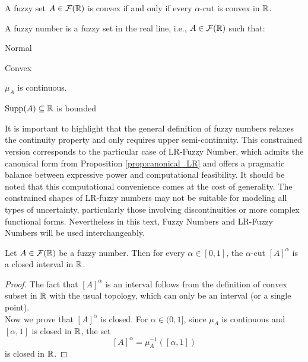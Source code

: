 \begin{definition}[Convexity] A fuzzy set $A\in \mathcal{F}(\mathbb{R})$ is convex if and only if every $\alpha$-cut is convex in $\mathbb{R}$.
    
\end{definition}

\begin{definition}
    \label{def:fuzz_num}
    A fuzzy number is a fuzzy set in the real line, i.e., $A\in \mathcal{F}(\mathbb{R})$ such that:\vspace{-0.9em}
    \begin{romanenum}
        \item Normal\vspace{-0.5em}
        \item Convex\vspace{-0.5em}
        \item $\mu_A$ is continuous.\vspace{-0.5em}
        \item $\textnormal{Supp}(A)\subseteq\mathbb{R}$ is bounded
    \end{romanenum}
    
\end{definition}

It is important to highlight that the general definition of fuzzy numbers relaxes the continuity property and only requires upper semi-continuity\cite{ApprLRFuzzNum}. This constrained version corresponds to the particular case of LR-Fuzzy Number, which admits the canonical form from Proposition \ref{prop:canonical_LR} and offers a pragmatic balance between expressive power and computational feasibility. It should be noted that this computational convenience comes at the cost of generality. The constrained shapes of LR-fuzzy numbers may not be suitable for modeling all types of uncertainty, particularly those involving discontinuities or more complex functional forms. Nevertheless in this text, Fuzzy Numbers and LR-Fuzzy Numbers will be used interchangeably.




\begin{proposition}
    Let $A\in \mathcal{F}(\mathbb{R})$ be a fuzzy number. Then for every $\alpha \in [0,1]$, the $\alpha$-cut $[A]^\alpha$ is a closed interval in $\mathbb{R}$.
\end{proposition}

\begin{proof}
The fact that $[A]^\alpha$ is an interval follows from the definition of convex subset in $\mathbb{R}$ with the usual topology, which can only be an interval (or a single point).\\
Now we prove that $[A]^\alpha$ is closed. For $\alpha \in (0,1]$, since $\mu_A$ is continuous and $[\alpha, 1]$ is closed in $\mathbb{R}$, the set
\[
[A]^\alpha = \mu_A^{-1}([\alpha, 1])
\]
is closed in $\mathbb{R}$. %
\end{proof}

